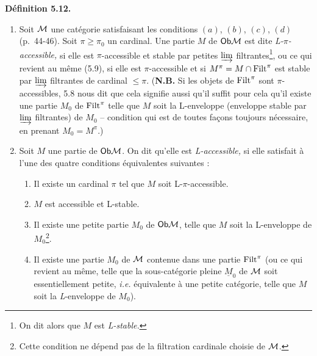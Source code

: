 \textbf{Définition 5.12.}
\begin{enumerate}[label={}]
\item[1)] Soit $\mathcal{M}$ une catégorie satisfaisant les conditions $(a)$, $(b)$, $(c)$, $(d)$ (p.~44-46). Soit $\pi \geq \pi_0$ un cardinal. Une partie $M$ de $\mathsf{Ob}\mathcal{M}$ est dite \textit{L-$\pi$-accessible,} si elle est $\pi$-accessible et stable par petites $\varinjlim$ filtrantes\footnote[24]{On dit alors que $M$ est \textit{L-stable.}}, ou ce qui revient au même (5.9), si elle est $\pi$-accessible et si $M^\pi = M \cap \mathrm{Filt}^\pi$ est stable par $\varinjlim$ filtrantes de cardinal $\leq \pi$. (\textbf{N.B.} Si les objets de $\mathrm{Filt}^\pi$ sont $\pi$-accessibles, 5.8 nous dit que cela signifie aussi qu'il suffit pour cela qu'il existe une partie $M_0$ de $\mathrm{Filt}^\pi$ telle que $M$ soit la L-enveloppe (enveloppe stable par $\varinjlim$ filtrantes) de $M_0$ -- condition qui est de toutes façons toujours nécessaire, en prenant $M_0 = M^\pi$.)
\item[2)] Soit $M$ une partie de $\mathsf{Ob}\mathcal{M}$. On dit qu'elle est \textit{L-accessible,} si elle satisfait à l'une des quatre conditions équivalentes suivantes :
\begin{enumerate}[label={}]
\item[\textit{a})] Il existe un cardinal $\pi$ tel que $M$ soit L-$\pi$-accessible.
\item[\textit{a}$'$)] $M$ est accessible et L-stable.
\item[\textit{b})] Il existe une petite partie $M_0$ de $\mathsf{Ob}\mathcal{M}$, telle que $M$ soit la L-enveloppe de $M_0$\footnote[25]{Cette condition ne dépend pas de la filtration cardinale choisie de $\mathcal{M}$.}.
\item[\textit{b}$'$)] Il existe une partie $M_0$ de $\mathcal{M}$ contenue dans une partie $\mathrm{Filt}^\pi$ (ou ce qui revient au même, telle que la sous-catégorie pleine $\underline{M}_0$ de $\mathcal{M}$ soit essentiellement petite, \textit{i.e.} équivalente à une petite catégorie, telle que $M$ soit la \textit{L}-enveloppe de $M_0$).
\end{enumerate}
\end{enumerate}


